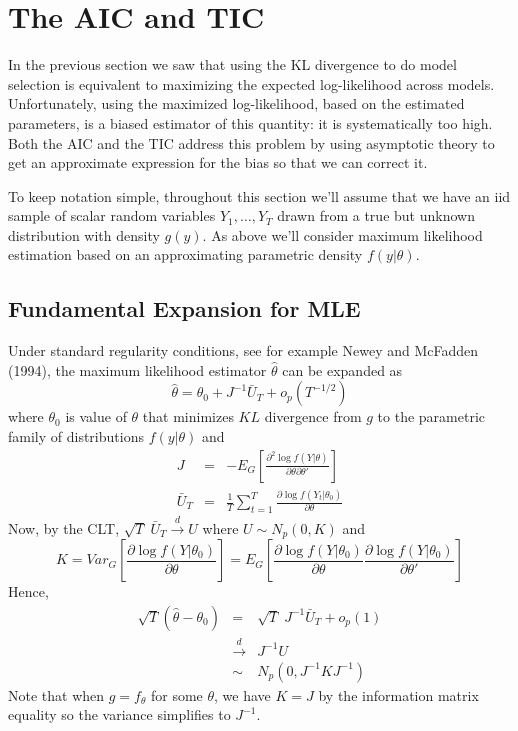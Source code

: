 \section{The AIC and TIC}
In the previous section we saw that using the KL divergence to do model selection is equivalent to maximizing the expected log-likelihood across models. Unfortunately, using the maximized log-likelihood, based on the estimated parameters, is a biased estimator of this quantity: it is systematically too high. Both the AIC and the TIC address this problem by using asymptotic theory to get an approximate expression for the bias so that we can correct it.

To keep notation simple, throughout this section we'll assume that we have an iid sample of scalar random variables $Y_1, \hdots, Y_T$ drawn from a true but unknown distribution with density $g(y)$. As above we'll consider maximum likelihood estimation based on an approximating parametric density $f(y|\theta)$.

\subsection{Fundamental Expansion for MLE}
Under standard regularity conditions, see for example Newey and McFadden (1994), the maximum likelihood estimator $\widehat{\theta}$ can be expanded as
$$\widehat{\theta} = \theta_0 + J^{-1} \bar{U}_T + o_p(T^{-1/2})$$
where $\theta_0$ is value of $\theta$ that minimizes $KL$ divergence from $g$ to the parametric family of distributions $f(y|\theta)$ and
\begin{eqnarray*}
J &=& -E_G \left[ \frac{\partial^2 \log f(Y|\theta)}{\partial \theta \partial \theta'}\right]\\
\bar{U}_T &=& \frac{1}{T} \sum_{t=1}^T \frac{\partial \log f(Y_t|\theta_0)}{\partial\theta}
\end{eqnarray*}
Now, by the CLT, $\sqrt{T}\; \bar{U}_T \overset{d}{\rightarrow} U$ where $U\sim N_p(0, K)$ and
$$K = Var_G \left[ \frac{\partial \log f(Y|\theta_0)}{\partial\theta}\right] = E_G\left[ \frac{\partial \log f(Y|\theta_0)}{\partial\theta} \frac{\partial \log f(Y|\theta_0)}{\partial\theta'}\right]$$
Hence,
\begin{eqnarray*}
\sqrt{T}\left(\widehat{\theta} - \theta_0 \right) &=& \sqrt{T} \; J^{-1} \bar{U}_T + o_p(1) \\
&\overset{d}{\rightarrow}& J^{-1} U\\
&\sim& N_p(0, J^{-1}KJ^{-1})
\end{eqnarray*}
Note that when $g = f_\theta$ for some $\theta$, we have $K = J$ by the information matrix equality so the variance simplifies to $J^{-1}$.


